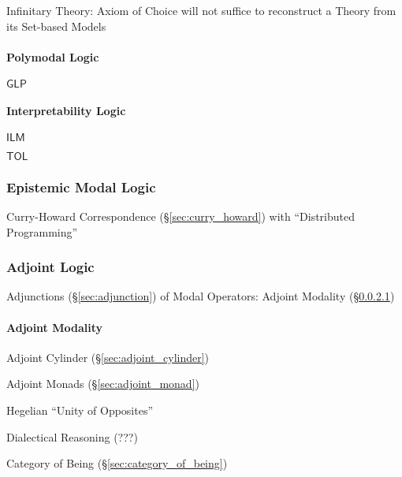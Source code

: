 Infinitary Theory: Axiom of Choice will not suffice to reconstruct a
Theory from its Set-based Models



\paragraph{Polymodal Logic}\label{sec:polymodal_logic}\hfill

$\mathsf{GLP}$



\paragraph{Interpretability Logic}\label{sec:interpretability_logic}\hfill

$\mathsf{ILM}$

$\mathsf{TOL}$



\subsubsection{Epistemic Modal Logic}\label{sec:epistemic_logic}

Curry-Howard Correspondence (\S\ref{sec:curry_howard}) with
``Distributed Programming''



\subsubsection{Adjoint Logic}\label{sec:adjoint_logic}

Adjunctions (\S\ref{sec:adjunction}) of Modal Operators: Adjoint
Modality (\S\ref{sec:adjoint_modality})



\paragraph{Adjoint Modality}\label{sec:adjoint_modality}\hfill

Adjoint Cylinder (\S\ref{sec:adjoint_cylinder})

Adjoint Monads (\S\ref{sec:adjoint_monad})

Hegelian ``Unity of Opposites''

Dialectical Reasoning (???) %

Category of Being (\S\ref{sec:category_of_being})

